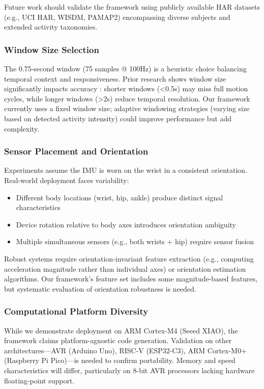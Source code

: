 Future work should validate the framework using publicly available HAR datasets (e.g., UCI HAR, WISDM, PAMAP2) encompassing diverse subjects and extended activity taxonomies.

\subsubsection{Window Size Selection}
The 0.75-second window (75 samples @ 100Hz) is a heuristic choice balancing temporal context and responsiveness. Prior research shows window size significantly impacts accuracy \cite{banos2014wisdm}: shorter windows (<0.5s) may miss full motion cycles, while longer windows (>2s) reduce temporal resolution. Our framework currently uses a fixed window size; adaptive windowing strategies (varying size based on detected activity intensity) could improve performance but add complexity.

\subsubsection{Sensor Placement and Orientation}
Experiments assume the IMU is worn on the wrist in a consistent orientation. Real-world deployment faces variability:
\begin{itemize}
    \item Different body locations (wrist, hip, ankle) produce distinct signal characteristics
    \item Device rotation relative to body axes introduces orientation ambiguity
    \item Multiple simultaneous sensors (e.g., both wrists + hip) require sensor fusion
\end{itemize}

Robust systems require orientation-invariant feature extraction (e.g., computing acceleration magnitude rather than individual axes) or orientation estimation algorithms. Our framework's feature set includes some magnitude-based features, but systematic evaluation of orientation robustness is needed.

\subsubsection{Computational Platform Diversity}
While we demonstrate deployment on ARM Cortex-M4 (Seeed XIAO), the framework claims platform-agnostic code generation. Validation on other architectures—AVR (Arduino Uno), RISC-V (ESP32-C3), ARM Cortex-M0+ (Raspberry Pi Pico)—is needed to confirm portability. Memory and speed characteristics will differ, particularly on 8-bit AVR processors lacking hardware floating-point support.

